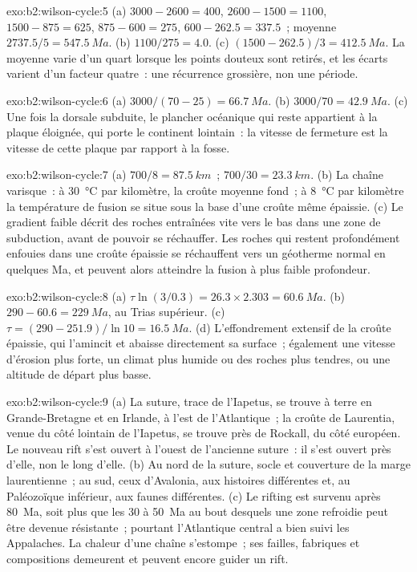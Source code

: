 \begin{solution}{exo:b2:wilson-cycle:5}
(a) $3000 - 2600 = 400$, $2600 - 1500 = 1100$, $1500 - 875 = 625$, $875 - 600 = 275$, $600 -
262.5 = 337.5$~; moyenne $2737.5/5 = \qty{547.5}{Ma}$. (b) $1100/275 = 4.0$. (c) $(1500 -
262.5)/3 = \qty{412.5}{Ma}$. La moyenne varie d'un quart lorsque les points douteux sont retirés, et les
écarts varient d'un facteur quatre~: une récurrence grossière, non une période.
\end{solution}

\begin{solution}{exo:b2:wilson-cycle:6}
(a) $3000/(70 - 25) = \qty{66.7}{Ma}$. (b) $3000/70 = \qty{42.9}{Ma}$. (c) Une fois la dorsale subduite, le
plancher océanique qui reste appartient à la plaque éloignée, qui porte le continent lointain~: la vitesse de
fermeture est la vitesse de cette plaque par rapport à la fosse.
\end{solution}

\begin{solution}{exo:b2:wilson-cycle:7}
(a) $700/8 = \qty{87.5}{km}$~; $700/30 = \qty{23.3}{km}$. (b) La chaîne varisque~: à
\qty{30}{\celsius} par kilomètre, la croûte moyenne fond~; à \qty{8}{\celsius} par kilomètre
la température de fusion se situe sous la base d'une croûte même épaissie. (c) Le gradient faible décrit des
roches entraînées vite vers le bas dans une zone de subduction, avant de pouvoir se réchauffer. Les roches qui restent
profondément enfouies dans une croûte épaissie se réchauffent vers un géotherme normal en quelques Ma, et peuvent
alors atteindre la fusion à plus faible profondeur.
\end{solution}

\begin{solution}{exo:b2:wilson-cycle:8}
(a) $\tau\ln(3/0.3) = 26.3\times2.303 = \qty{60.6}{Ma}$. (b) $290 - 60.6 = \qty{229}{Ma}$, au
Trias supérieur. (c) $\tau = (290 - 251.9)/\ln10 = \qty{16.5}{Ma}$. (d) L'effondrement extensif de la
croûte épaissie, qui l'amincit et abaisse directement sa surface~; également une
vitesse d'érosion plus forte, un climat plus humide ou des roches plus tendres, ou une altitude de départ plus basse.
\end{solution}

\begin{solution}{exo:b2:wilson-cycle:9}
(a) La suture, trace de l'Iapetus, se trouve à terre en Grande-Bretagne et en Irlande, à l'est
de l'Atlantique~; la croûte de Laurentia, venue du côté lointain de l'Iapetus, se trouve près de Rockall, du
côté européen. Le nouveau rift s'est ouvert à l'ouest de l'ancienne suture~: il s'est ouvert près d'elle, non le long d'elle.
(b) Au nord de la suture, socle et couverture de la marge laurentienne~; au sud, ceux d'Avalonia,
aux histoires différentes et, au Paléozoïque inférieur, aux faunes différentes. (c) Le rifting
est survenu après 80~Ma, soit plus que les 30 à 50~Ma au bout desquels une zone refroidie peut être devenue
résistante~; pourtant l'Atlantique central a bien suivi les Appalaches. La chaleur d'une chaîne s'estompe~; ses
failles, fabriques et compositions demeurent et peuvent encore guider un rift.
\end{solution}

